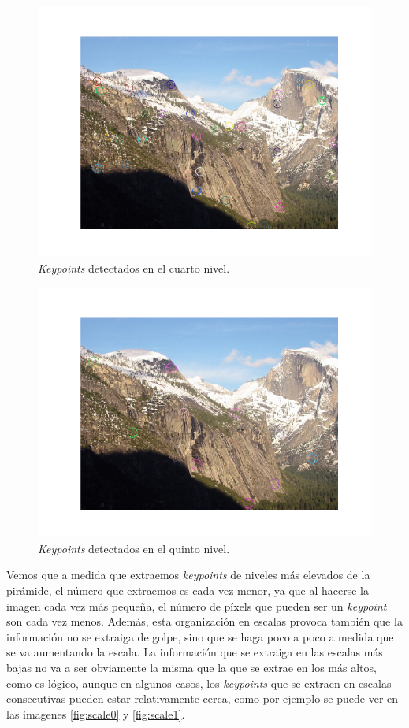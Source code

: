 \documentclass[11pt,a4paper]{article}
\begin{document}
\begin{figure}[H]
	\centering
	\includegraphics[scale=0.6]{img/scale3}
	\caption{\textit{Keypoints} detectados en el cuarto nivel.}
	\label{fig:scale3}
\end{figure}

\begin{figure}[H]
	\centering
	\includegraphics[scale=0.6]{img/scale4}
	\caption{\textit{Keypoints} detectados en el quinto nivel.}
	\label{fig:scale4}
\end{figure}

Vemos que a medida que extraemos \textit{keypoints} de niveles más elevados
de la pirámide, el número que extraemos es cada vez menor, ya que al hacerse la
imagen cada vez más pequeña, el número de píxels que pueden ser un \textit{keypoint}
son cada vez menos. Además, esta organización en escalas provoca también que
la información no se extraiga de golpe, sino que se haga poco a poco a medida que
se va aumentando la escala. La información que se extraiga en las escalas más bajas
no va a ser obviamente la misma que la que se extrae en los más altos, como es
lógico, aunque en algunos casos, los \textit{keypoints} que se extraen en escalas
consecutivas pueden estar relativamente cerca, como por ejemplo se
puede ver en las imagenes \ref{fig:scale0} y \ref{fig:scale1}.
\end{document}
